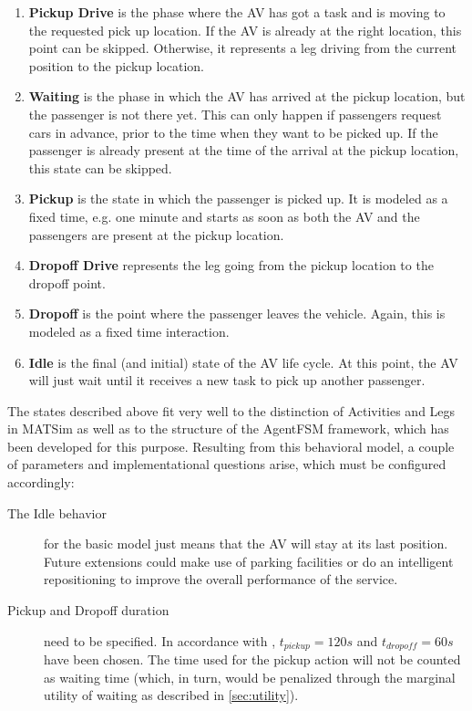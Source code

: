 \begin{enumerate}
\item \textbf{Pickup Drive} is the phase where the AV has got a task and is moving
to the requested pick up location. If the AV is already at the right location, this
point can be skipped. Otherwise, it represents a leg driving from the current position
to the pickup location.
\item \textbf{Waiting} is the phase in which the AV has arrived at the pickup
location, but the passenger is not there yet. This can only happen if passengers
request cars in advance, prior to the time when they want to be picked
up. If the passenger is already present at the time of the arrival at the pickup
location, this state can be skipped.
\item \textbf{Pickup} is the state in which the passenger is picked up. It is
modeled as a fixed time, e.g. one minute and starts as soon as both the AV
and the passengers are present at the pickup location.
\item \textbf{Dropoff Drive} represents the leg going from the pickup location to
the dropoff point.
\item \textbf{Dropoff} is the point where the passenger leaves the vehicle. Again,
this is modeled as a fixed time interaction.
\item \textbf{Idle} is the final (and initial) state of the AV life cycle. At this
point, the AV will just wait until it receives a new task to pick up another passenger.
\end{enumerate}

The states described above fit very well to the distinction of Activities and Legs
in MATSim as well as to the structure of the AgentFSM framework, which has been
developed for this purpose. Resulting from this behavioral model, a couple of
parameters and implementational questions arise, which must be configured accordingly:

\begin{description}
\item[The Idle behavior] for the basic model just means that the AV will stay at
its last position. Future extensions could make use of parking facilities or do
an intelligent repositioning to improve the overall performance of the service.

\item[Pickup and Dropoff duration] need to be specified. In accordance with
\citet{Bischoff2016}, $t_{pickup} = 120s$ and $t_{dropoff} = 60s$ have been chosen. The time
used for the pickup action will not be counted as waiting time (which, in turn,
would be penalized through the marginal utility of waiting as described in \cref{sec:utility}).
\end{description}

